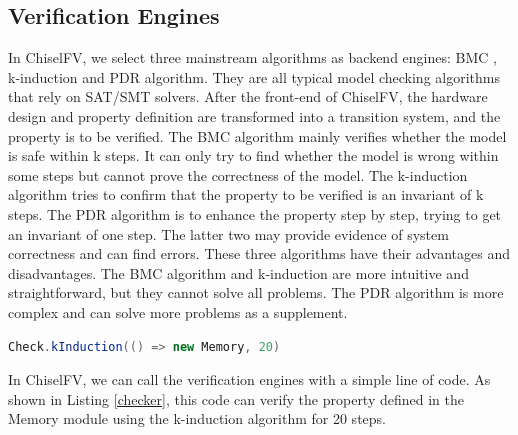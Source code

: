 \documentclass[conference]{IEEEtran}
\theoremstyle{definition}
\begin{document}
\subsection{Verification Engines}
In ChiselFV, we select three mainstream algorithms as backend engines: BMC \cite{biere1999symbolic}, k-induction \cite{sheeran2000checking} and PDR \cite{bradley2011sat} algorithm. 
They are all typical model checking algorithms that rely on SAT/SMT solvers. After the front-end of ChiselFV, the hardware design and property definition are transformed into a transition system, and the property is to be verified. The BMC algorithm mainly verifies whether the model is safe within k steps. It can only try to find whether the model is wrong within some steps but cannot prove the correctness of the model. The k-induction algorithm tries to confirm that the property to be verified is an invariant of k steps. The PDR algorithm is to enhance the property step by step, trying to get an invariant of one step. The latter two may provide evidence of system correctness and can find errors. These three algorithms have their advantages and disadvantages. The BMC algorithm and k-induction are more intuitive and straightforward, but they cannot solve all problems. The PDR algorithm is more complex and can solve more problems as a supplement.

\begin{lstlisting}[language=scala, caption={A Code Clip to Call Formal Verification}, label=checker]
Check.kInduction(() => new Memory, 20)
\end{lstlisting}

In ChiselFV, we can call the verification engines with a simple line of code. As shown in Listing \ref{checker}, this code can verify the property defined in the Memory module using the k-induction algorithm for 20 steps.
\end{document}
